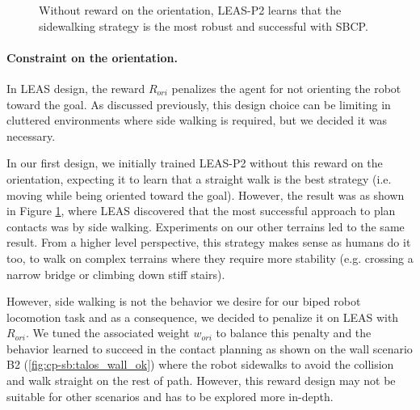 \begin{figure}[h]
\begin{subfigure}[t]{0.19\linewidth}
    \end{subfigure}
    \caption{Without reward on the orientation, LEAS-P2 learns that the sidewalking strategy is the most robust and successful with SBCP.}
    \label{fig:cp-sb:sidewalk_seq}
\end{figure}


\paragraph{Constraint on the orientation.}
In LEAS design, the reward $R_{ori}$ penalizes the agent for not orienting the robot toward the goal. 
As discussed previously, this design choice can be limiting in cluttered environments where side walking is required, but we decided it was necessary.

In our first design, we initially trained LEAS-P2 without this reward on the orientation, expecting it to learn that a straight walk is the best strategy (i.e. moving while being oriented toward the goal). 
However, the result was as shown in Figure \ref{fig:cp-sb:sidewalk_seq}, where LEAS discovered that the most successful approach to plan contacts was by side walking.
Experiments on our other terrains led to the same result. 
From a higher level perspective, this strategy makes sense as humans do it too, to walk on complex terrains where they require more stability (e.g. crossing a narrow bridge or climbing down stiff stairs).

However, side walking is not the behavior we desire for our biped robot locomotion task and as a consequence, we decided to penalize it on LEAS with $R_{ori}$. We tuned the associated weight $w_{ori}$ to balance this penalty and the behavior learned to succeed in the contact planning as shown on the wall scenario B2 (\ref{fig:cp-sb:talos_wall_ok}) where the robot sidewalks to avoid the collision and walk straight on the rest of path. However, this reward design may not be suitable for other scenarios and has to be explored more in-depth.

